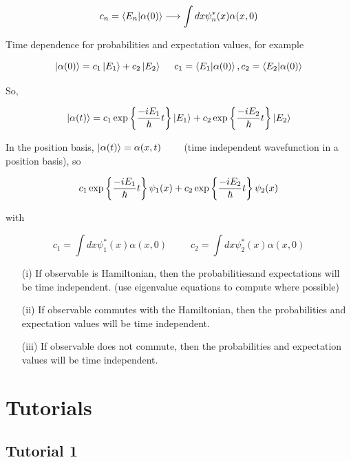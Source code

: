 \documentclass[english, 11pt]{article}
\begin{document}
      \[ c_n = \braket{E_n}{\alpha(0)} \longrightarrow \int dx \psi_n^*(x) \alpha(x,0) \]

      Time dependence for probabilities and expectation values, for example

      \[ \ket{\alpha(0)} = c_1\ket{E_1} + c_2\ket{E_2} \ \ \ \ c_1 = \braket{E_1}{\alpha(0)}, c_2 = \braket{E_2}{\alpha(0)} \]

      So,

      \[ \left|\alpha(t)\right\rangle = c_1\exp \left\{ \frac{-iE_1}{\hbar}t \right\}\left|E_1\right\rangle + c_2\exp \left\{ \frac{-iE_2}{\hbar}t \right\}\left|E_2\right\rangle \]

      In the position basis, $\left|\alpha(t)\right\rangle = \alpha(x,t)$  \ \ \ \ (time independent wavefunction in a position basis), so

      \[ c_1 \exp \left\{ \frac{-iE_1}{\hbar}t \right\} \psi_1(x) + c_2\exp \left\{ \frac{-iE_2}{\hbar}t \right\}\psi_2(x)\]

      with

      \[ c_1 = \int dx \psi_1^*(x)\alpha(x,0) \ \ \ \ \ \  \ \ \ \ \ c_2 = \int dx \psi_2^*(x)\alpha(x,0) \]

      \begin{itemize}
        \item[(i)] If observable is Hamiltonian, then the probabilitiesand expectations will be time independent. (use eigenvalue equations to compute where possible)
        \item[(ii)] If observable commutes with the Hamiltonian, then the probabilities and expectation values will be time independent.
        \item[(iii)] If observable does not commute, then the probabilities and expectation values will be time independent.
      \end{itemize}












   \section{Tutorials}

     \subsection{Tutorial 1}
\end{document}
